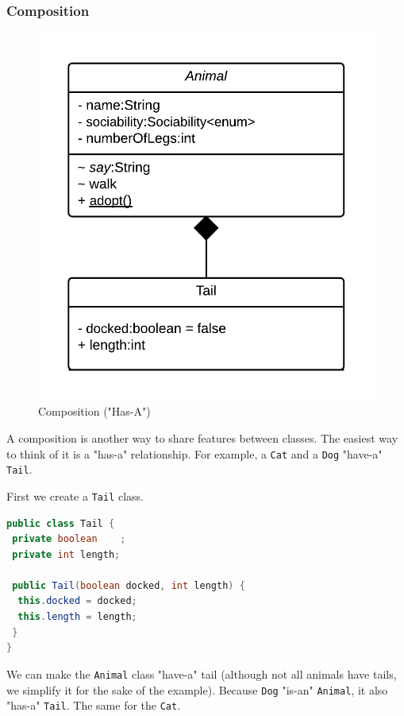 \subsubsection{Composition}
\begin{figure}[!h]\centering %
\includegraphics[width=0.9\linewidth, frame]{images/composition}
\caption{Composition ("Has-A")}
\label{fig:composition}
\end{figure}

A composition is another way to share features between classes. The easiest way to think of it is a "has-a" relationship. For example, a \texttt{Cat} and a \texttt{Dog} "have-a" \texttt{Tail}.

First we create a \texttt{Tail} class.
\begin{lstlisting}[language=Java]
public class Tail {
 private boolean 	;
 private int length;

 public Tail(boolean docked, int length) {
  this.docked = docked;
  this.length = length;
 }
}
\end{lstlisting}

We can make the \texttt{Animal} class "have-a" tail (although not all animals have tails, we simplify it for the sake of the example). Because \texttt{Dog} "is-an" \texttt{Animal}, it also "has-a" \texttt{Tail}. The same for the \texttt{Cat}.

